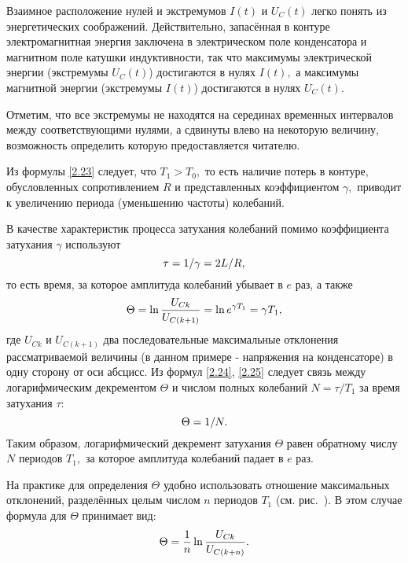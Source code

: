 Взаимное расположение нулей и экстремумов $I(t)$ и $U_C(t)$ легко понять из энергетических соображений. Действительно, запасённая в контуре электромагнитная энергия заключена в электрическом поле конденсатора и магнитном поле катушки индуктивности, так что максимумы электрической энергии (экстремумы $U_C(t)$) достигаются в нулях $I(t),$ а максимумы магнитной энергии (экстремумы $I(t)$) достигаются в нулях $U_C(t).$

Отметим, что все экстремумы не находятся на серединах временных интервалов между соответствующими нулями, а сдвинуты влево на некоторую величину, возможность определить которую предоставляется читателю.

Из формулы \eqref{2.23} следует, что $T_1>T_0,$ то есть наличие потерь в контуре, обусловленных сопротивлением $R$ и представленных коэффициентом $\gamma,$ приводит к увеличению периода (уменьшению частоты) колебаний.

В качестве характеристик процесса затухания колебаний помимо коэффициента затухания $\gamma$ используют 
\begin{equation}\eqmark{2.24}
\tau=1/\gamma=2L/R,
\end{equation}
то есть время, за которое амплитуда колебаний убывает в $e$ раз, а также 
\begin{equation}\eqmark{2.25}
\Theta=\ln\dfrac{U_{Ck}}{U_{C(k+1)}}=\ln e^{\gamma T_1}=\gamma T_1,
\end{equation}
где $U_{Ck}$ и $U_{C(k+1)}$ \important{--} два последовательные максимальные отклонения рассматриваемой величины (в данном примере - напряжения на конденсаторе) в одну сторону от оси абсцисс. Из формул \eqref{2.24}, \eqref{2.25} следует связь между логарифмическим декрементом $\Theta$ и числом полных колебаний $N=\tau/T_1$ за время затухания $\tau:$
\begin{equation}\eqmark{2.26}
\Theta=1/N.
\end{equation}
Таким образом, логарифмический декремент затухания $\Theta$ равен обратному числу $N$ периодов  $T_1,$ за которое амплитуда колебаний падает в $e$ раз.
 
На практике для определения $\Theta$ удобно использовать отношение максимальных отклонений, разделённых целым числом $n$ периодов $T_1$ (см. рис.~). В этом случае формула для $\Theta$ принимает вид:
\begin{equation}\eqmark{2.27}
\Theta=\dfrac{1}{n}\ln\dfrac{U_{Ck}}{U_{C(k+n)}}.
\end{equation}

